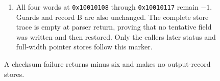 \begin{figure}[htbp]
\begin{minipage}{\linewidth}
\begin{enumerate}
      \item All four words at \texttt{0x10010108} through \texttt{0x10010117} remain $-1$. Guards and record B are also unchanged. The complete store trace is empty at parser return, proving that no tentative field was written and then restored. Only the caller\textquotesingle s later status and full-width pointer stores follow this marker.
    \end{enumerate}
  \end{minipage}
  \caption{A checksum failure returns minus six and makes no output-record stores.}
  \label{capture:013-binary-packet-parser-f03-checksum}
  \label{packet-f03-checksum}
\end{figure}
\par

